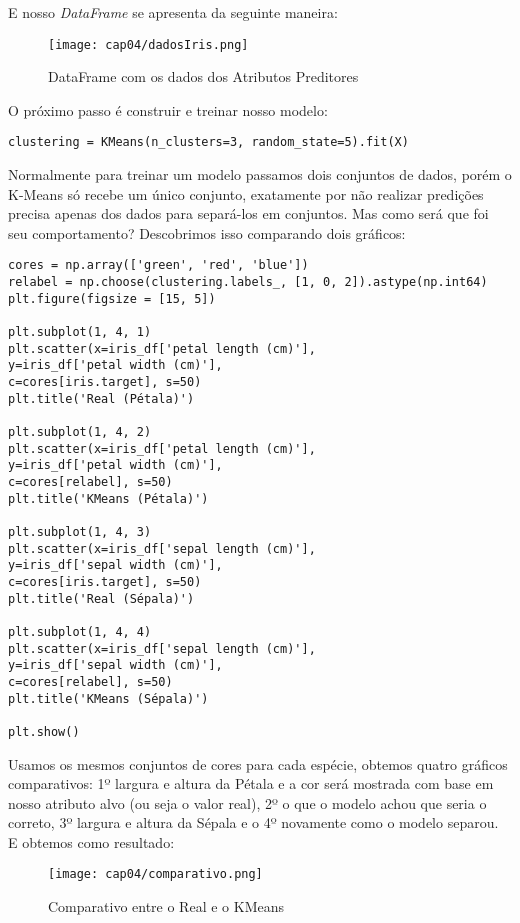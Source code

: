 E nosso \textit{DataFrame} se apresenta da seguinte maneira:
\begin{figure}[H]
	\centering
	\texttt{[image: cap04/dadosIris.png]}
	\caption{DataFrame com os dados dos Atributos Preditores}
\end{figure}

O próximo passo é construir e treinar nosso modelo:
\begin{lstlisting}[]
clustering = KMeans(n_clusters=3, random_state=5).fit(X)
\end{lstlisting}

Normalmente para treinar um modelo passamos dois conjuntos de dados, porém o K-Means só recebe um único conjunto, exatamente por não realizar predições precisa apenas dos dados para separá-los em conjuntos. Mas como será que foi seu comportamento? Descobrimos isso comparando dois gráficos:
\begin{lstlisting}[]
cores = np.array(['green', 'red', 'blue'])
relabel = np.choose(clustering.labels_, [1, 0, 2]).astype(np.int64)
plt.figure(figsize = [15, 5])

plt.subplot(1, 4, 1)
plt.scatter(x=iris_df['petal length (cm)'], 
y=iris_df['petal width (cm)'], 
c=cores[iris.target], s=50)
plt.title('Real (Pétala)')

plt.subplot(1, 4, 2)
plt.scatter(x=iris_df['petal length (cm)'], 
y=iris_df['petal width (cm)'], 
c=cores[relabel], s=50)
plt.title('KMeans (Pétala)')

plt.subplot(1, 4, 3)
plt.scatter(x=iris_df['sepal length (cm)'], 
y=iris_df['sepal width (cm)'], 
c=cores[iris.target], s=50)
plt.title('Real (Sépala)')

plt.subplot(1, 4, 4)
plt.scatter(x=iris_df['sepal length (cm)'], 
y=iris_df['sepal width (cm)'], 
c=cores[relabel], s=50)
plt.title('KMeans (Sépala)')

plt.show()
\end{lstlisting}

Usamos os mesmos conjuntos de cores para cada espécie, obtemos quatro gráficos comparativos: 1º largura e altura da Pétala e a cor será mostrada com base em nosso atributo alvo (ou seja o valor real), 2º o que o modelo achou que seria o correto, 3º largura e altura da Sépala e o 4º novamente como o modelo separou. E obtemos como resultado:
\begin{figure}[H]
	\centering
	\texttt{[image: cap04/comparativo.png]}
	\caption{Comparativo entre o Real e o KMeans}
\end{figure}

